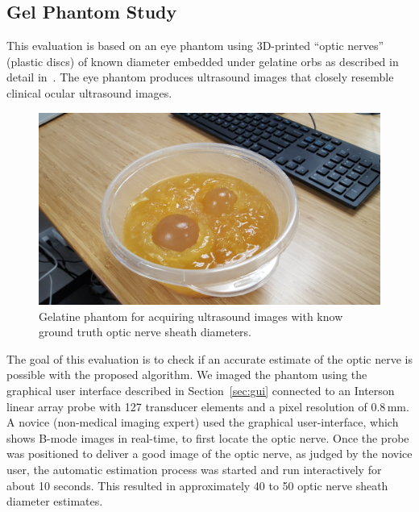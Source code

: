 \documentclass{llncs}
\begin{document}
\subsection{Gel Phantom Study}
\label{sec:groundtruth}
This evaluation is based on an eye phantom using 3D-printed “optic nerves”
(plastic discs) of known diameter embedded under gelatine orbs as described in
detail in~\cite{Ze2014}. The eye phantom produces ultrasound images that closely
resemble clinical ocular ultrasound images.
\begin{figure}
\centering
\includegraphics[width=0.6\linewidth]{phantom.jpg} 
\caption{
\label{fig:phantom}
Gelatine phantom for acquiring ultrasound images with know ground truth optic
nerve sheath diameters. 
}
\end{figure}

The goal of this evaluation is to check if an accurate estimate of the optic
nerve is possible with the proposed algorithm. We imaged the phantom using the
graphical user interface described in Section~\ref{sec:gui} connected to an
Interson linear array probe with 127 transducer elements and a pixel resolution of
0.8\,mm. A novice (non-medical imaging expert) used the graphical
user-interface, which shows B-mode images in real-time, to first locate the
optic nerve. Once the probe was positioned to deliver a good image of the optic
nerve, as judged by the novice user, the automatic estimation process was
started and run interactively for about 10 seconds. This resulted in
approximately 40 to 50 optic nerve sheath diameter estimates. 
\end{document}
